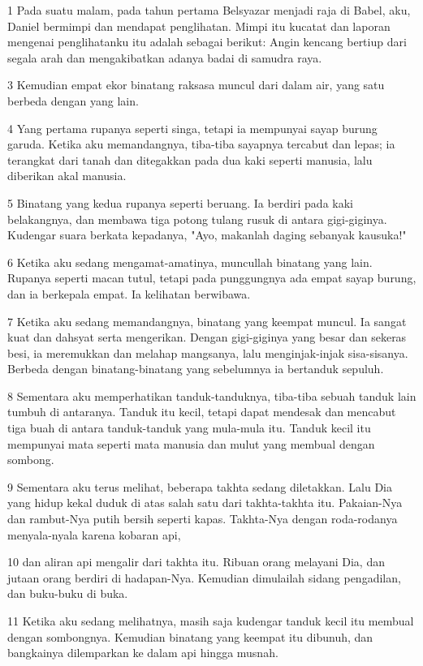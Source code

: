 \par 1 Pada suatu malam, pada tahun pertama Belsyazar menjadi raja di Babel, aku, Daniel bermimpi dan mendapat penglihatan. Mimpi itu kucatat dan laporan mengenai penglihatanku itu adalah sebagai berikut: Angin kencang bertiup dari segala arah dan mengakibatkan adanya badai di samudra raya.
\par 3 Kemudian empat ekor binatang raksasa muncul dari dalam air, yang satu berbeda dengan yang lain.
\par 4 Yang pertama rupanya seperti singa, tetapi ia mempunyai sayap burung garuda. Ketika aku memandangnya, tiba-tiba sayapnya tercabut dan lepas; ia terangkat dari tanah dan ditegakkan pada dua kaki seperti manusia, lalu diberikan akal manusia.
\par 5 Binatang yang kedua rupanya seperti beruang. Ia berdiri pada kaki belakangnya, dan membawa tiga potong tulang rusuk di antara gigi-giginya. Kudengar suara berkata kepadanya, "Ayo, makanlah daging sebanyak kausuka!"
\par 6 Ketika aku sedang mengamat-amatinya, muncullah binatang yang lain. Rupanya seperti macan tutul, tetapi pada punggungnya ada empat sayap burung, dan ia berkepala empat. Ia kelihatan berwibawa.
\par 7 Ketika aku sedang memandangnya, binatang yang keempat muncul. Ia sangat kuat dan dahsyat serta mengerikan. Dengan gigi-giginya yang besar dan sekeras besi, ia meremukkan dan melahap mangsanya, lalu menginjak-injak sisa-sisanya. Berbeda dengan binatang-binatang yang sebelumnya ia bertanduk sepuluh.
\par 8 Sementara aku memperhatikan tanduk-tanduknya, tiba-tiba sebuah tanduk lain tumbuh di antaranya. Tanduk itu kecil, tetapi dapat mendesak dan mencabut tiga buah di antara tanduk-tanduk yang mula-mula itu. Tanduk kecil itu mempunyai mata seperti mata manusia dan mulut yang membual dengan sombong.
\par 9 Sementara aku terus melihat, beberapa takhta sedang diletakkan. Lalu Dia yang hidup kekal duduk di atas salah satu dari takhta-takhta itu. Pakaian-Nya dan rambut-Nya putih bersih seperti kapas. Takhta-Nya dengan roda-rodanya menyala-nyala karena kobaran api,
\par 10 dan aliran api mengalir dari takhta itu. Ribuan orang melayani Dia, dan jutaan orang berdiri di hadapan-Nya. Kemudian dimulailah sidang pengadilan, dan buku-buku di buka.
\par 11 Ketika aku sedang melihatnya, masih saja kudengar tanduk kecil itu membual dengan sombongnya. Kemudian binatang yang keempat itu dibunuh, dan bangkainya dilemparkan ke dalam api hingga musnah.
